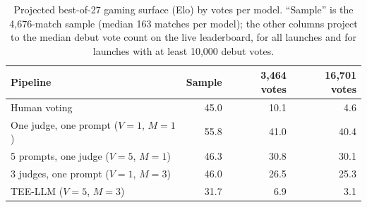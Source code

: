 \begin{table}[ht]
\centering
\caption{Projected best-of-27 gaming surface (Elo) by votes per model. ``Sample'' is the 4,676-match sample (median 163 matches per model); the other columns project to the median debut vote count on the live leaderboard, for all launches and for launches with at least 10,000 debut votes.}
\label{tab:gaming_projection}
\small
\begin{tabular}{lrrr}
\toprule
Pipeline & Sample & 3,464 votes & 16,701 votes \\
\midrule
Human voting & 45.0 & 10.1 & 4.6 \\
One judge, one prompt ($V{=}1$, $M{=}1$) & 55.8 & 41.0 & 40.4 \\
5 prompts, one judge ($V{=}5$, $M{=}1$) & 46.3 & 30.8 & 30.1 \\
3 judges, one prompt ($V{=}1$, $M{=}3$) & 46.0 & 26.5 & 25.3 \\
TEE-LLM ($V{=}5$, $M{=}3$) & 31.7 & 6.9 & 3.1 \\
\bottomrule
\end{tabular}
\end{table}
